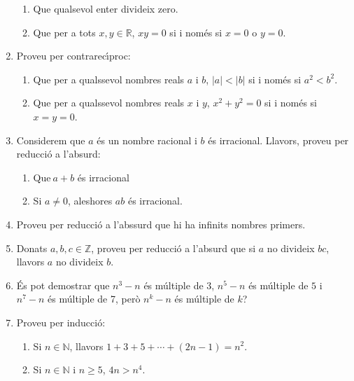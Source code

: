 \begin{enumerate}
\begin{enumerate}
\item Que qualsevol enter divideix zero.

\item Que per a tots $x,y\in\mathbb{R}$, $xy=0$ si i nom\'{e}s si $x=0$ o
$y=0$.
\end{enumerate}

\item Proveu per contrarec\'{\i}proc:

\begin{enumerate}
\item Que per a qualssevol nombres reals $a$ i $b$, $\left\vert a\right\vert
<\left\vert b\right\vert $ si i nom\'{e}s si $a^{2}<b^{2}$.

\item Que per a qualssevol nombres reals $x$ i $y$, $x^{2}+y^{2}=0$ si i
nom\'{e}s si $x=y=0$.
\end{enumerate}

\item Considerem que $a$ \'{e}s un nombre racional i $b$ \'{e}s irracional.
Llavors, proveu per reducci\'{o} a l'absurd:

\begin{enumerate}
\item Que$~a+b$ \'{e}s irracional

\item Si $a\neq0$, aleshores $ab$ \'{e}s irracional.
\end{enumerate}

\item Proveu per reducci\'{o} a l'abssurd que hi ha infinits nombres primers.

\item Donats $a,b,c\in\mathbb{Z}$, proveu per reducci\'{o} a l'absurd que si
$a$ no divideix $bc$, llavors $a$ no divideix $b$.

\item \'{E}s pot demostrar que $n^{3}-n$ \'{e}s m\'{u}ltiple de 3, $n^{5}-n$
\'{e}s m\'{u}ltiple de $5$ i $n^{7}-n$ \'{e}s m\'{u}ltiple de 7, per\`{o}
$n^{k}-n$ \'{e}s m\'{u}ltiple de $k$?

\item Proveu per inducci\'{o}:

\begin{enumerate}
\item Si $n\in\mathbb{N}$, llavors $1+3+5+\cdots+\left(  2n-1\right)  =n^{2}$.

\item Si $n\in\mathbb{N}$ i $n\geq5$, $4n>n^{4}$.


\end{enumerate}
\end{enumerate}
